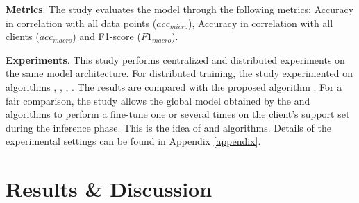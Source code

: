 \documentclass[runningheads]{llncs}
\begin{document}
\begin{table}[h]
    \caption{Statistics on MNIST and CIFAR-10 (non-IID data)}
    \label{tab:stat_noniid_data}
\end{table}

\textbf{Metrics}. The study evaluates the model through the following metrics: Accuracy in correlation with all data points ($acc_{micro}$), Accuracy in correlation with all clients ($acc_{macro}$) and F1-score ($F1_{macro}$).

\textbf{Experiments}. This study performs centralized and distributed experiments on the same model architecture. For distributed training, the study experimented on algorithms , , , . The results are compared with the proposed algorithm . For a fair comparison, the study allows the global model obtained by the  and  algorithms to perform a fine-tune one or several times on the client's support set during the inference phase. This is the idea of  and  algorithms. Details of the experimental settings can be found in Appendix \ref{appendix}.

\section{Results \& Discussion}
\end{document}
